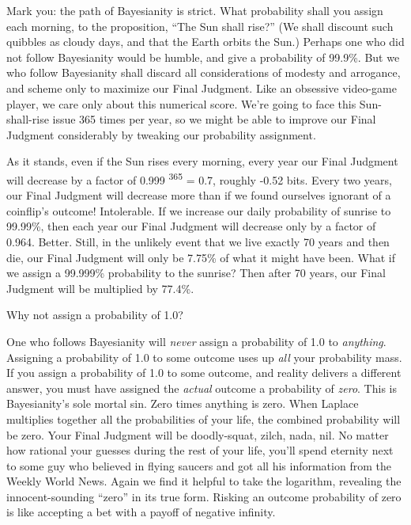 {
 Mark you: the path of Bayesianity is strict. What probability
shall you assign each morning, to the proposition,
``The Sun shall rise?'' (We shall
discount such quibbles as cloudy days, and that the Earth orbits the
Sun.) Perhaps one who did not follow Bayesianity would be humble, and
give a probability of 99.9\%. But we who follow Bayesianity shall
discard all considerations of modesty and arrogance, and scheme only to
maximize our Final Judgment. Like an obsessive video-game player, we
care only about this numerical score. We're going to
face this Sun-shall-rise issue 365 times per year, so we might be able
to improve our Final Judgment considerably by tweaking our probability
assignment.}

{
 As it stands, even if the Sun rises every morning, every year our
Final Judgment will decrease by a factor of 0.999\textsuperscript{ 365}
= 0.7, roughly -0.52 bits. Every two years, our Final Judgment will
decrease more than if we found ourselves ignorant of a
coinflip's outcome! Intolerable. If we increase our
daily probability of sunrise to 99.99\%, then each year our Final
Judgment will decrease only by a factor of 0.964. Better. Still, in the
unlikely event that we live exactly 70 years and then die, our Final
Judgment will only be 7.75\% of what it might have been. What if we
assign a 99.999\% probability to the sunrise? Then after 70 years, our
Final Judgment will be multiplied by 77.4\%.}

{
 Why not assign a probability of 1.0?}

{
 One who follows Bayesianity will \textit{never} assign a
probability of 1.0 to \textit{anything}. Assigning a probability of 1.0
to some outcome uses up \textit{all} your probability mass. If you
assign a probability of 1.0 to some outcome, and reality delivers a
different answer, you must have assigned the \textit{actual} outcome a
probability of \textit{zero}. This is Bayesianity's
sole mortal sin. Zero times anything is zero. When Laplace multiplies
together all the probabilities of your life, the combined probability
will be zero. Your Final Judgment will be doodly-squat, zilch, nada,
nil. No matter how rational your guesses during the rest of your life,
you'll spend eternity next to some guy who believed in
flying saucers and got all his information from the Weekly World News.
Again we find it helpful to take the logarithm, revealing the
innocent-sounding ``zero'' in its
true form. Risking an outcome probability of zero is like accepting a
bet with a payoff of negative infinity.}

